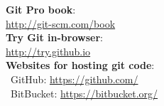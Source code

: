 \documentclass[12pt]{article}
\begin{document}
{{\bf Git Pro book}:\\
\url{http://git-scm.com/book}\\

{\bf Try Git in-browser}:\\
\url{http://try.github.io}\\

{\bf Websites for hosting git code}:\\
\textbullet\, GitHub: \url{https://github.com/}\\
\textbullet\, BitBucket: \url{https://bitbucket.org/}\\
} %
\end{document}
